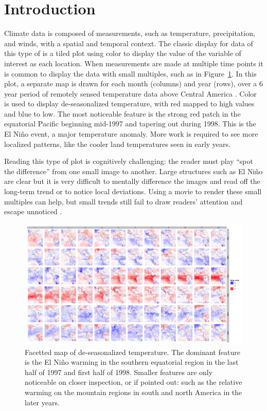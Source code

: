 \documentclass[oneside]{article}
\begin{document}
\section{Introduction}

Climate data is composed of measurements, such as temperature, precipitation, and winds, with a spatial and temporal context. The classic display for data of this type of is a tiled plot using color to display the value of the variable of interest as each location. When measurements are made at multiple time points it is common to display the data with small multiples, such as in Figure~\ref{fig:nasa-facet}. In this plot, a separate map is drawn for each month (columns) and year (rows), over a 6 year period of remotely sensed temperature data above Central America \citet{murrell:2010}. Color is used to display de-seasonalized temperature, with red mapped to high values and blue to low. The most noticeable feature is the strong red patch in the equatorial Pacific beginning mid-1997 and tapering out during 1998. This is the El Ni\~no event, a major temperature anomaly. More work is required to see more localized patterns, like the cooler land temperatures seen in early years.

Reading this type of plot is cognitively challenging: the reader must play ``spot the difference'' from one small image to another. Large structures such as El Ni\~no are clear but it is very difficult to mentally difference the images and read off the long-term trend or to notice local deviations. Using a movie to render these small multiples can help, but small trends still fail to draw readers' attention and escape unnoticed \citep{simons:gradual}.

\begin{figure}[htbp]
  \centering
  \includegraphics[width=5.5in]{nasa-colored-map.png}
  \caption{Facetted map of de-seasonalized temperature. The dominant feature is the El Ni\~no warming in the southern equatorial region in the last half of 1997 and first half of 1998. Smaller features are only noticeable on closer inspection, or if pointed out: such as the relative warming on the mountain regions in south and north America in the later years.}
  \label{fig:nasa-facet}
\end{figure}
\end{document}
